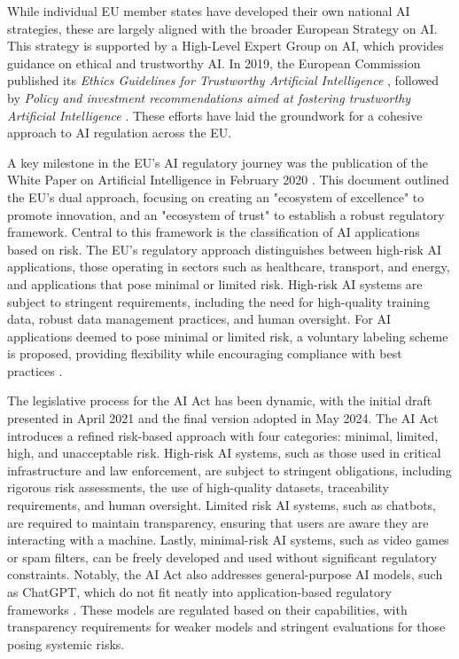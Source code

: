 While individual EU member states have developed their own national AI strategies, these are largely aligned with the broader European Strategy on AI. This strategy is supported by a High-Level Expert Group on AI, which provides guidance on ethical and trustworthy AI. In 2019, the European Commission published its \textit{Ethics Guidelines for Trustworthy Artificial Intelligence} \cite{eu_trustworthy_ai_2019}, followed by \textit{Policy and investment recommendations aimed at fostering trustworthy Artificial Intelligence} \cite{eu_ai_investment_2019}. These efforts have laid the groundwork for a cohesive approach to AI regulation across the EU.

A key milestone in the EU's AI regulatory journey was the publication of the White Paper on Artificial Intelligence in February 2020 \cite{eu_white_paper_ai_2020}. This document outlined the EU's dual approach, focusing on creating an "ecosystem of excellence" to promote innovation, and an "ecosystem of trust" to establish a robust regulatory framework. Central to this framework is the classification of AI applications based on risk. The EU's regulatory approach distinguishes between high-risk AI applications, those operating in sectors such as healthcare, transport, and energy, and applications that pose minimal or limited risk. High-risk AI systems are subject to stringent requirements, including the need for high-quality training data, robust data management practices, and human oversight. For AI applications deemed to pose minimal or limited risk, a voluntary labeling scheme is proposed, providing flexibility while encouraging compliance with best practices \cite{mhc_regulating_ai_2023}.

The legislative process for the AI Act has been dynamic, with the initial draft presented in April 2021 and the final version adopted in May 2024. The AI Act introduces a refined risk-based approach with four categories: minimal, limited, high, and unacceptable risk. High-risk AI systems, such as those used in critical infrastructure and law enforcement, are subject to stringent obligations, including rigorous risk assessments, the use of high-quality datasets, traceability requirements, and human oversight. Limited risk AI systems, such as chatbots, are required to maintain transparency, ensuring that users are aware they are interacting with a machine. Lastly, minimal-risk AI systems, such as video games or spam filters, can be freely developed and used without significant regulatory constraints. Notably, the AI Act also addresses general-purpose AI models, such as ChatGPT, which do not fit neatly into application-based regulatory frameworks \cite{reuters_eu_ai_rules_2023}. These models are regulated based on their capabilities, with transparency requirements for weaker models and stringent evaluations for those posing systemic risks.

